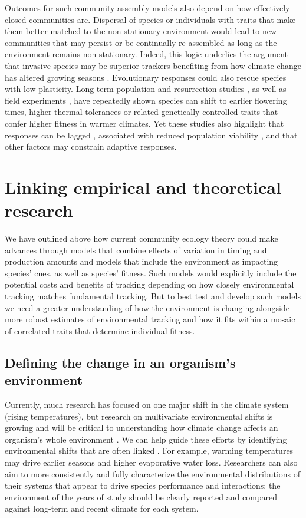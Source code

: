 \documentclass[11pt,letterpaper]{article}
\begin{document}
Outcomes for such community assembly models also depend on how effectively closed communities are. Dispersal of species or individuals with traits that make them better matched to the non-stationary environment would lead to new communities that may persist or be continually re-assembled as long as the environment remains non-stationary. Indeed, this logic underlies the argument that invasive species may be superior trackers benefiting from how climate change has altered growing seasons \citep{Willis:2010al,wolkovich:2010fee}. Evolutionary responses could also rescue species with low plasticity. Long-term population \citep[e.g.,][]{colautti2017} and resurrection studies \citep{wilczek2014,yousey2018}, as well as field experiments \citep{colautti2017,arab2019}, have repeatedly shown species can shift to earlier flowering times, higher thermal tolerances or related genetically-controlled traits that confer higher fitness in warmer climates. Yet these studies also highlight that responses can be lagged \citep[e.g.,][]{wilczek2014}, associated with reduced population viability \citep[e.g.,][]{colautti2017}, and that other factors may constrain adaptive responses.

\section{Linking empirical and theoretical research}
We have outlined above how  current community ecology theory could make advances through models that combine effects of variation in timing and production amounts and models that include the environment as impacting species' cues, as well as species' fitness. Such models would explicitly include the potential costs and benefits of tracking  depending on how closely environmental tracking matches fundamental tracking. But to best test and develop such models we need a greater understanding of how the environment is changing alongside more robust estimates of environmental tracking and how it fits within a mosaic of correlated traits that determine individual fitness. 

\subsection{Defining the change in an organism's environment} 
Currently, much research has focused on one major shift in the climate system (rising temperatures), but research on multivariate environmental shifts is growing and will be critical to understanding how climate change affects an organism's whole environment \citep[e.g.,][]{chevin2015}. We can help guide these efforts by identifying environmental shifts that are often linked \citep[e.g.,][]{wadgymar2018}. For example, warming temperatures may drive earlier seasons and higher evaporative water loss. Researchers can also aim to more consistently and fully characterize the environmental distributions of their systems that appear to drive species performance and interactions: the environment of the years of study should be clearly reported and compared against long-term and recent climate for each system. 
\end{document}
